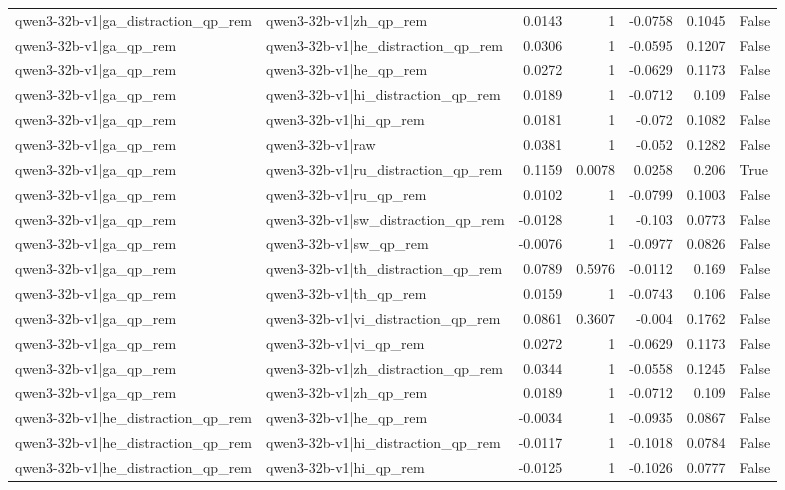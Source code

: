 \begin{table}
\begin{tabular}{l l r r r r l}
qwen3-32b-v1|ga_distraction_qp_rem & qwen3-32b-v1|zh_qp_rem & 0.0143 & 1 & -0.0758 & 0.1045 & False \\
qwen3-32b-v1|ga_qp_rem & qwen3-32b-v1|he_distraction_qp_rem & 0.0306 & 1 & -0.0595 & 0.1207 & False \\
qwen3-32b-v1|ga_qp_rem & qwen3-32b-v1|he_qp_rem & 0.0272 & 1 & -0.0629 & 0.1173 & False \\
qwen3-32b-v1|ga_qp_rem & qwen3-32b-v1|hi_distraction_qp_rem & 0.0189 & 1 & -0.0712 & 0.109 & False \\
qwen3-32b-v1|ga_qp_rem & qwen3-32b-v1|hi_qp_rem & 0.0181 & 1 & -0.072 & 0.1082 & False \\
qwen3-32b-v1|ga_qp_rem & qwen3-32b-v1|raw & 0.0381 & 1 & -0.052 & 0.1282 & False \\
qwen3-32b-v1|ga_qp_rem & qwen3-32b-v1|ru_distraction_qp_rem & 0.1159 & 0.0078 & 0.0258 & 0.206 & True \\
qwen3-32b-v1|ga_qp_rem & qwen3-32b-v1|ru_qp_rem & 0.0102 & 1 & -0.0799 & 0.1003 & False \\
qwen3-32b-v1|ga_qp_rem & qwen3-32b-v1|sw_distraction_qp_rem & -0.0128 & 1 & -0.103 & 0.0773 & False \\
qwen3-32b-v1|ga_qp_rem & qwen3-32b-v1|sw_qp_rem & -0.0076 & 1 & -0.0977 & 0.0826 & False \\
qwen3-32b-v1|ga_qp_rem & qwen3-32b-v1|th_distraction_qp_rem & 0.0789 & 0.5976 & -0.0112 & 0.169 & False \\
qwen3-32b-v1|ga_qp_rem & qwen3-32b-v1|th_qp_rem & 0.0159 & 1 & -0.0743 & 0.106 & False \\
qwen3-32b-v1|ga_qp_rem & qwen3-32b-v1|vi_distraction_qp_rem & 0.0861 & 0.3607 & -0.004 & 0.1762 & False \\
qwen3-32b-v1|ga_qp_rem & qwen3-32b-v1|vi_qp_rem & 0.0272 & 1 & -0.0629 & 0.1173 & False \\
qwen3-32b-v1|ga_qp_rem & qwen3-32b-v1|zh_distraction_qp_rem & 0.0344 & 1 & -0.0558 & 0.1245 & False \\
qwen3-32b-v1|ga_qp_rem & qwen3-32b-v1|zh_qp_rem & 0.0189 & 1 & -0.0712 & 0.109 & False \\
qwen3-32b-v1|he_distraction_qp_rem & qwen3-32b-v1|he_qp_rem & -0.0034 & 1 & -0.0935 & 0.0867 & False \\
qwen3-32b-v1|he_distraction_qp_rem & qwen3-32b-v1|hi_distraction_qp_rem & -0.0117 & 1 & -0.1018 & 0.0784 & False \\
qwen3-32b-v1|he_distraction_qp_rem & qwen3-32b-v1|hi_qp_rem & -0.0125 & 1 & -0.1026 & 0.0777 & False \\

\end{tabular}
\end{table}
